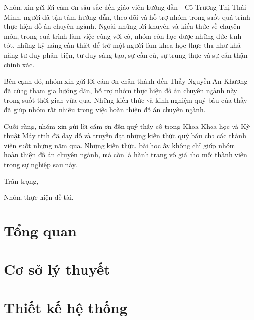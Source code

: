 \documentclass[a4paper, twoside, 12pt]{report}
\theoremstyle{definition}
\begin{document}
	Nhóm xin gửi lời cảm ơn sâu sắc đến giáo viên hướng dẫn - Cô Trương Thị Thái Minh, người đã tận tâm hướng dẫn, theo dõi và hỗ trợ nhóm trong suốt quá trình thực hiện đồ án chuyên ngành. Ngoài những lời khuyên và kiến thức về chuyên môn, trong quá trình làm việc cùng với cô, nhóm còn học được những đức tính tốt, những kỹ năng cần thiết để trở một người làm khoa học thực thụ như khả năng tư duy phản biện, tư duy sáng tạo, sự cần cù, sự trung thực và sự cẩn thận chính xác.

	Bên cạnh đó, nhóm xin gửi lời cám ơn chân thành đến Thầy Nguyễn An Khương đã cùng tham gia hướng dẫn, hỗ trợ nhóm thực hiện đồ án chuyên ngành này trong suốt thời gian vừa qua. Những kiến thức và kinh nghiệm quý báu của thầy đã giúp nhóm rất nhiều trong việc hoàn thiện đồ án chuyên ngành.

	Cuối cùng, nhóm xin gửi lời cám ơn đến quý thầy cô trong Khoa Khoa học và Kỹ thuật Máy tính đã dạy dỗ và truyền đạt những kiến thức quý báu cho các thành viên suốt những năm qua. Những kiến thức, bài học ấy không chỉ giúp nhóm hoàn thiện đồ án chuyên ngành, mà còn là hành trang vô giá cho mỗi thành viên trong sự nghiệp sau này.

	\hspace{10cm} Trân trọng,

	\hspace{9cm} Nhóm thực hiện đề tài. 

\setlength{\parskip}{0mm}

\tableofcontents

\newpage
\listoffigures
\newpage

\listoftables



\chapter{Tổng quan}



\chapter{Cơ sở lý thuyết}



\chapter{Thiết kế hệ thống}

\end{document}
